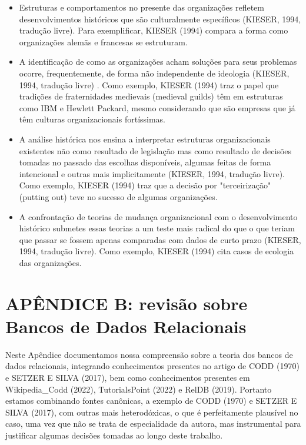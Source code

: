 \begin{itemize}
\item Estruturas e comportamentos no presente das organizações refletem desenvolvimentos históricos que são culturalmente específicos  (KIESER, 1994, tradução livre). Para exemplificar,  KIESER (1994) compara a forma como organizações alemãs e francesas se estruturam.
\item A identificação de como as organizações acham soluções para seus problemas ocorre, frequentemente, de forma não independente de ideologia  (KIESER, 1994, tradução livre) . Como exemplo,  KIESER (1994) traz o papel  que tradições de fraternidades medievais (medieval guilds) têm em estruturas como IBM e Hewlett Packard, mesmo considerando que são empresas que já têm culturas organizacionais fortíssimas.
\item A análise histórica nos ensina a interpretar estruturas organizacionais existentes não como resultado de legislação mas como resultado de decisões tomadas no passado das escolhas disponíveis, algumas feitas de forma intencional e outras mais implicitamente  (KIESER, 1994, tradução livre). Como exemplo,  KIESER (1994) traz que a decisão por "terceirização" (putting out) teve no sucesso de algumas organizações.
\item A confrontação de teorias de mudança organizacional com o desenvolvimento histórico submetes essas teorias a um teste mais radical do que o que teriam que passar se fossem apenas comparadas com dados de curto prazo (KIESER, 1994, tradução livre). Como exemplo,  KIESER (1994) cita casos de ecologia das organizações.
\end{itemize}

\chapter[APÊNDICE B: revisão sobre Bancos de Dados Relacionais]{APÊNDICE B: revisão sobre Bancos de Dados Relacionais}\label{APÊNDICE B: revisão sobre Bancos de Dados Relacionais}
Neste Apêndice documentamos nossa compreensão sobre a teoria dos bancos de dados relacionais, integrando conhecimentos presentes no artigo de  CODD (1970) e  SETZER E SILVA (2017), bem como conhecimentos presentes em Wikipedia\_Codd (2022),  TutorialsPoint (2022) e  RelDB (2019). Portanto estamos combinando fontes canônicas, a exemplo de  CODD (1970) e SETZER E SILVA (2017), com outras mais heterodóxicas, o que é perfeitamente plausível no caso, uma vez que não se trata de especialidade da autora, mas instrumental para justificar algumas decisões tomadas ao longo deste trabalho.

